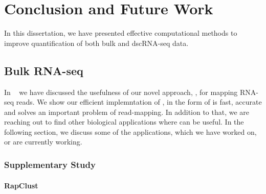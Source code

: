 
\chapter{Conclusion and Future Work} %
\label{conclusion} %



In this dissertation, we have presented effective computational methods to improve 
quantification of both bulk and dscRNA-seq data.

\section{Bulk RNA-seq}

In ~ we have discussed the usefulness of our novel approach, \qm, 
for mapping RNA-seq reads. We show our efficient implemntation of \qm, in the 
form of \rapmap is fast, accurate and solves an important problem of read-mapping. 
In addition to that, we are reaching out to find other biological applications where 
\rapmap can be useful. In the following section, we discuss some of the applications, 
which we have worked on, or are currently working. 

\subsection{Supplementary Study}
\subsubsection{RapClust~\citep{srivastava2016accurate}}

